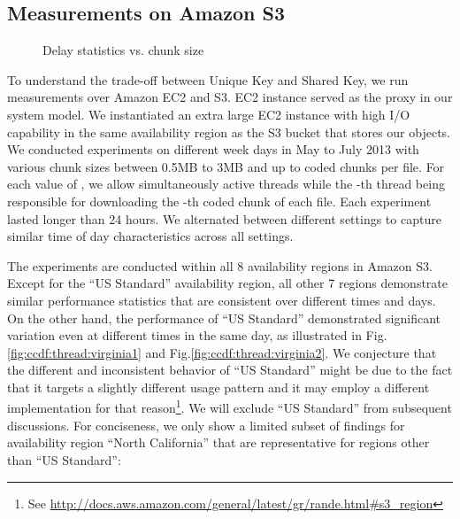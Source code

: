 \documentclass[journal]{IEEEtran}
\newcommand{\onewidth}{0.74\columnwidth}
\begin{document}
\fi

\subsection{Measurements on Amazon S3}
\label{ssec:measurement:S3}









\begin{figure*}[!t]
\centering
\null\hfill
	\hfill
\hfill\null
\caption{Delay statistics vs. chunk size}
\label{fig:delay-chunkSize}
\end{figure*}

To understand the trade-off between Unique Key and Shared Key, we run measurements over Amazon EC2 and S3. EC2 instance served as the proxy in our system model. We instantiated an extra large EC2 instance with high I/O capability in the same availability region as the S3 bucket that stores our objects. We conducted experiments on different week days in May to July 2013 with various chunk sizes between 0.5MB to 3MB and up to  coded chunks per file. For each value of , we allow  simultaneously active threads while the -th thread being responsible for downloading the -th coded chunk of each file. Each experiment lasted longer than 24 hours. We alternated between different settings to capture similar time of day characteristics across all settings. 


The experiments are conducted within all 8  availability regions in Amazon S3. 
Except for the ``US Standard'' availability region, all other 7 regions demonstrate similar performance statistics that are consistent over different times and days. On the other hand, the performance of ``US Standard'' demonstrated significant variation even at different times in the same day, as illustrated in Fig.\ref{fig:ccdf:thread:virginia1} and Fig.\ref{fig:ccdf:thread:virginia2}. We conjecture that the different and inconsistent behavior of ``US Standard'' might be due to the fact that it targets a slightly different usage pattern and it may employ a different implementation for that reason\footnote{See \url{http://docs.aws.amazon.com/general/latest/gr/rande.html#s3_region}}. We will exclude ``US Standard'' from subsequent discussions. 
For conciseness, we only show a limited subset of findings for availability region ``North California'' that are representative for regions other than ``US Standard'':
\end{document}
